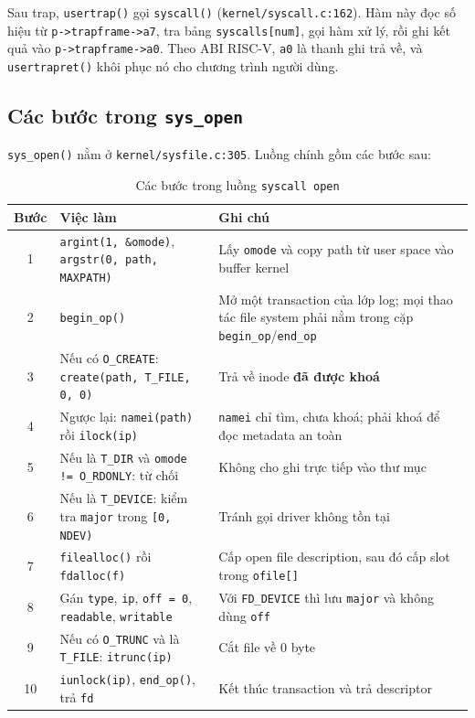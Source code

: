 Sau trap, \texttt{usertrap()} gọi \texttt{syscall()} (\texttt{kernel/syscall.c:162}). Hàm này đọc số hiệu từ \texttt{p->trapframe->a7}, tra bảng \texttt{syscalls[num]}, gọi hàm xử lý, rồi ghi kết quả vào \texttt{p->trapframe->a0}. Theo ABI RISC-V, \texttt{a0} là thanh ghi trả về, và \texttt{usertrapret()} khôi phục nó cho chương trình người dùng.

\subsection{Các bước trong \texttt{sys\_open}}

\texttt{sys\_open()} nằm ở \texttt{kernel/sysfile.c:305}. Luồng chính gồm các bước sau:

\begin{table}[H]
\centering
\renewcommand{\arraystretch}{1.3}
\setlength{\tabcolsep}{8pt}
\begin{tabular}{|c|p{7cm}|p{7cm}|}
\hline
\rowcolor[rgb]{0.8, 0.9, 1.0}
\textbf{Bước} & \textbf{Việc làm} & \textbf{Ghi chú} \\ \hline
1 & \texttt{argint(1, \&omode)}, \texttt{argstr(0, path, MAXPATH)} & Lấy \texttt{omode} và copy path từ user space vào buffer kernel \\ \hline
2 & \texttt{begin\_op()} & Mở một transaction của lớp log; mọi thao tác file system phải nằm trong cặp \texttt{begin\_op}/\texttt{end\_op} \\ \hline
3 & Nếu có \texttt{O\_CREATE}: \texttt{create(path, T\_FILE, 0, 0)} & Trả về inode \textbf{đã được khoá} \\ \hline
4 & Ngược lại: \texttt{namei(path)} rồi \texttt{ilock(ip)} & \texttt{namei} chỉ tìm, chưa khoá; phải khoá để đọc metadata an toàn \\ \hline
5 & Nếu là \texttt{T\_DIR} và \texttt{omode != O\_RDONLY}: từ chối & Không cho ghi trực tiếp vào thư mục \\ \hline
6 & Nếu là \texttt{T\_DEVICE}: kiểm tra \texttt{major} trong \texttt{[0, NDEV)} & Tránh gọi driver không tồn tại \\ \hline
7 & \texttt{filealloc()} rồi \texttt{fdalloc(f)} & Cấp open file description, sau đó cấp slot trong \texttt{ofile[]} \\ \hline
8 & Gán \texttt{type}, \texttt{ip}, \texttt{off = 0}, \texttt{readable}, \texttt{writable} & Với \texttt{FD\_DEVICE} thì lưu \texttt{major} và không dùng \texttt{off} \\ \hline
9 & Nếu có \texttt{O\_TRUNC} và là \texttt{T\_FILE}: \texttt{itrunc(ip)} & Cắt file về 0 byte \\ \hline
10 & \texttt{iunlock(ip)}, \texttt{end\_op()}, trả \texttt{fd} & Kết thúc transaction và trả descriptor \\ \hline
\end{tabular}
\caption{Các bước trong luồng \texttt{syscall open}}
\end{table}

